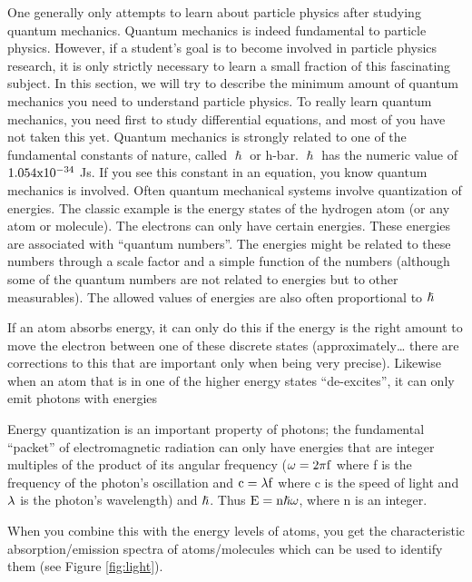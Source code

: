 One generally only attempts to learn about particle physics after studying quantum mechanics.  Quantum mechanics is indeed fundamental to particle physics.  However, if a 
student's goal is to become involved in particle physics research, it is only strictly necessary to learn a small fraction of this fascinating subject.  In this section, we will try to describe the minimum amount of quantum mechanics you need to understand particle physics.  To really learn quantum mechanics, you need first to study differential equations, and most of you have not taken this yet.
Quantum mechanics is strongly related to one of the fundamental constants of nature, called 
$\hslash$ or h-bar.  $\hslash$ has the numeric value of ${\rm 1.054x10^{-34}}$ Js.  
If you see this constant in an equation, you know quantum mechanics is involved.
Often quantum mechanical systems involve quantization of energies.  The classic example is the energy states of the hydrogen atom (or any atom or molecule).  The electrons can only have certain energies.  These energies are associated with ``quantum numbers''.  The energies might be related to these numbers through a scale factor and a simple function of the numbers 
(although some of the quantum numbers are not related to energies but to other measurables).  The allowed values of energies are also often proportional to
${\rm \hslash}$

If an atom absorbs energy, it can only do this if the energy is the right amount to move the electron between one of these discrete states (approximately… there are corrections to this that are important only when being very precise).  Likewise when an atom that is in one of the higher energy states “de-excites”, it can only emit photons with energies

Energy quantization is an important property of  photons; the fundamental “packet” of electromagnetic radiation can only have energies that are integer multiples of the product of its angular frequency (${\rm \omega = 2 \pi f}$ where f is the frequency of the photon’s oscillation and ${\rm c = \lambda f}$  where c is the speed of light and ${\rm \lambda}$  is the photon’s wavelength) and ${\rm \hslash}$.  
Thus ${\rm E=n \hslash \omega}$,  where n is an integer.

When you combine this with the energy levels of atoms, you get the characteristic absorption/emission spectra of atoms/molecules which can be used to identify them (see Figure \ref{fig:light}).


